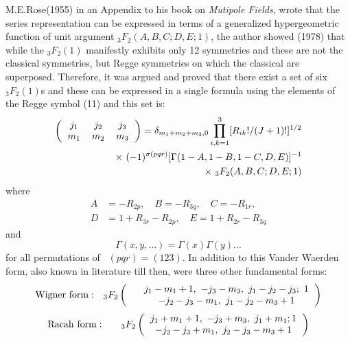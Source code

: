 M.E.Rose(1955) in an Appendix to his book on \textit{Mutipole Fields}, wrote
that the series representation can be expressed in terms of a generalized hypergeometric 
function of unit argument ${}_3F_2(A, B, C; D, E; 1)$,  the author showed (1978) that
while the $_3F_2(1)$ manifestly exhibits only 12 symmetries and these are not the 
classical symmetries, but Regge symmetries on which the classical are
superposed. Therefore, it was argued and proved that there exist a set of six $_3F_2(1)$s 
and these can be expressed in a single formula using the elements of 
the Regge symbol (11) and this set is:
\begin{equation}
\begin{split}
\left(
\begin{tabular}{ccc}
$j_1$&  $j_2$& $j_3$ \\ $m_1$& $m_2$& $m_3$ \\ 
\end{tabular}
\right) 
=  \delta_{m_1+m_2+m_3,0} \prod_{i,k=1}^3 [R_{ik}!/(J+1)!]^{1/2}\\
\times \ (-1)^{\sigma(pqr)} [\Gamma(1-A, 1-B, 1-C, D, E)]^{-1}\\
\times \ {}_3F_2(A, B, C; D, E; 1)\hfill \label{chap29-eq13}
\end{split}
\end{equation}
where
\begin{equation}
\begin{split}
A & =-R_{2p},\quad B=-R_{3q},\quad C=-R_{1r},\\
D & =1+R_{3r}-R_{2p},\quad E=1+R_{2r}-R_{3q} \label{chap29-eq14}
\end{split}
\end{equation}
and 
\begin{equation}
\Gamma(x,y,\ldots)=\Gamma(x)\Gamma(y)\ldots \label{chap29-eq15}
\end{equation}
for all permutations of \ $(pqr)=(123)$. In addition to this Vander Waerden form,
also known in literature till then, were three other fundamental forms:
\begin{equation}
{\rm Wigner\ form:}\quad {}_3F_2
\left(
\begin{tabular}{lc}
&$j_1-m_1+1,\ -j_3-m_3,\ j_1-j_2-j_3;\ 1$\\
&$-j_2-j_3-m_1,\ j_1-j_2-m_3+1$\\ 
\end{tabular} 
\right) \label{chap29-eq16}
\end{equation}
\begin{equation}
{\rm Racah\ form:}\qquad {}_3F_2
\left(
\begin{tabular}{c}
$j_1+m_1+1,\ -j_3+m_3,\ j_1+m_1; 1$\\
$-j_2-j_3+m_1,\ j_2-j_3-m_3+1$\\ 
\end{tabular} 
\right) \label{chap29-eq17}
\end{equation}

